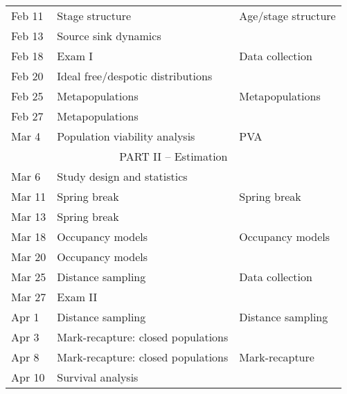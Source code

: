 \documentclass[11pt]{article}
\begin{document}
\begin{center}
\begin{tabular}[c]{lll}
\hline
Feb 11     & Stage structure                                 & Age/stage structure               \\
Feb 13     & Source sink dynamics                            &                                   \\
\hline 
Feb 18     & Exam I                                          & Data collection                   \\
Feb 20     & Ideal free/despotic distributions               &                                   \\
\hline
Feb 25     & Metapopulations                                 & Metapopulations                   \\
Feb 27     & Metapopulations                                 &                                   \\
\hline
Mar 4      & Population viability analysis                   & PVA                               \\
\hline
           \multicolumn{3}{c}{PART II -- Estimation}                                             \\
\hline
Mar 6      & Study design and statistics                     &                                   \\
\hline
Mar 11     & Spring break                                    & Spring break                      \\
Mar 13     & Spring break                                    &                                   \\
\hline
Mar 18     & Occupancy models                                & Occupancy models                  \\
Mar 20     & Occupancy models                                &                                   \\
\hline
Mar 25     & Distance sampling                               & Data collection                   \\
Mar 27     & Exam II                                         &                                   \\
\hline
Apr 1      & Distance sampling                               & Distance sampling                 \\
Apr 3      & Mark-recapture: closed populations              &                                   \\
\hline
Apr 8      & Mark-recapture: closed populations              & Mark-recapture                    \\
Apr 10     & Survival analysis                               &                                   \\

\end{tabular}
\end{center}
\end{document}
